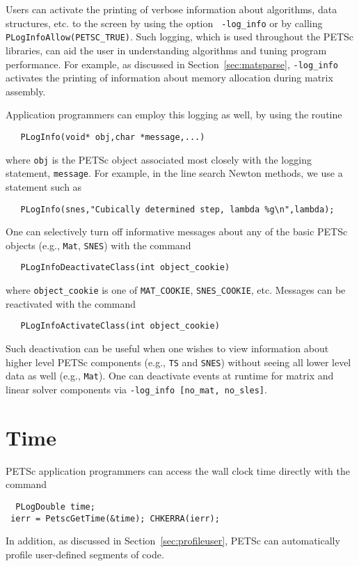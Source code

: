 Users can activate the printing of verbose information about
algorithms, data structures, etc. to the screen by using the option {\tt
-log\_info}  or by calling {\tt
PLogInfoAllow(PETSC\_TRUE)}. 
Such logging, which is used throughout the PETSc libraries,
can aid the user in understanding algorithms and 
tuning program performance.  For example, as discussed in
Section~\ref{sec:matsparse}, {\tt -log\_info} activates the
printing of information about memory allocation during
matrix assembly.

Application programmers can employ this logging as well, by
using the routine 
\begin{verbatim}
   PLogInfo(void* obj,char *message,...)
\end{verbatim}
where {\tt obj} is the PETSc object associated most closely with
the logging statement, {\tt message}.
For example, in the line search Newton methods, we use a statement such as
\begin{verbatim}
   PLogInfo(snes,"Cubically determined step, lambda %g\n",lambda);
\end{verbatim}

One can selectively turn off informative messages about any of the 
basic PETSc objects (e.g., {\tt Mat}, {\tt SNES}) with the command
\begin{verbatim}
   PLogInfoDeactivateClass(int object_cookie)
\end{verbatim}
where  
{\tt object\_cookie} is one of {\tt MAT\_COOKIE}, {\tt SNES\_COOKIE}, etc.
Messages can be reactivated with the command
\begin{verbatim}
   PLogInfoActivateClass(int object_cookie)
\end{verbatim}
Such deactivation can be useful when one wishes to view information
about higher level PETSc components (e.g., {\tt TS} and {\tt SNES}) without 
seeing all lower level data as well (e.g., {\tt Mat}).  One can deactivate
events at runtime for matrix and linear solver components via {\tt -log\_info [no\_mat, no\_sles]}.

\section{Time}

PETSc application programmers can access the wall clock time directly 
with the command 
\begin{verbatim}
  PLogDouble time;
 ierr = PetscGetTime(&time); CHKERRA(ierr);
\end{verbatim}
 
In addition, as discussed in Section~\ref{sec:profileuser},
PETSc can automatically profile user-defined segments of code.

